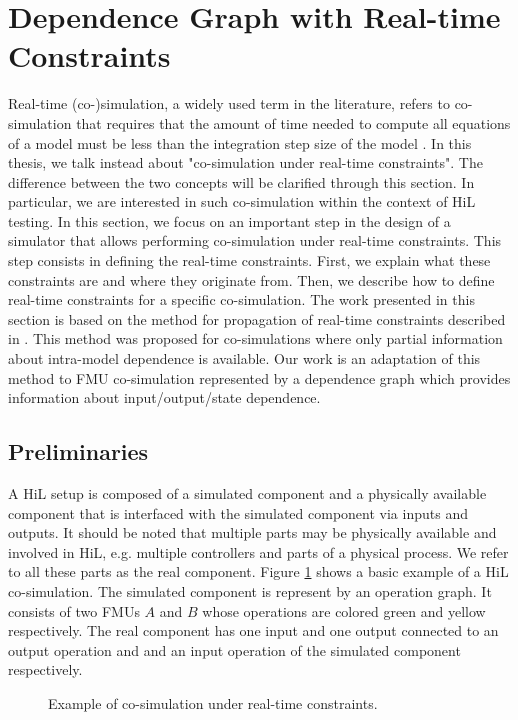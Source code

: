 \section{\label{sec:grphrtsc}Dependence Graph with Real-time Constraints}

Real-time (co-)simulation, a widely used term in the literature, refers to co-simulation that requires that the amount of time needed to compute all equations of a model must be less than the integration step size of the model \cite{belanger:2010}. In this thesis, we talk instead about "co-simulation under real-time constraints". The difference between the two concepts will be clarified through this section. In particular, we are interested in such co-simulation within the context of HiL testing. In this section, we focus on an important step in the design of a simulator that allows performing co-simulation under real-time constraints. This step consists in defining the real-time constraints. First, we explain what these constraints are and where they originate from. Then, we describe how to define real-time constraints for a specific co-simulation. The work presented in this section is based on the method for propagation of real-time constraints described in \cite{faure:2011}. This method was proposed for co-simulations where only partial information about intra-model dependence is available. Our work is an adaptation of this method to FMU co-simulation represented by a dependence graph which provides information about input/output/state dependence.

\subsection{Preliminaries}

A HiL setup is composed of a simulated component and a physically available component that is interfaced with the simulated component via inputs and outputs. It should be noted that multiple parts may be physically available and involved in HiL, e.g. multiple controllers and parts of a physical process. We refer to all these parts as the real component. Figure \ref{fig:hilSetup} shows a basic example of a HiL co-simulation. The simulated component is represent by an operation graph. It consists of two FMUs $A$ and $B$ whose operations are colored green and yellow respectively. The real component has one input and one output connected to an output operation and and an input operation of the simulated component respectively. 

\begin{figure}[phbt]
\centering

\caption{Example of co-simulation under real-time constraints.}
\label{fig:hilSetup}
\end{figure}


